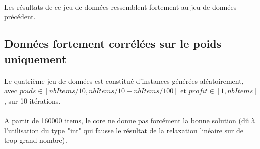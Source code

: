 \documentclass[12pt]{article}
\begin{document}
\paragraph{}Les résultats de ce jeu de données ressemblent fortement au jeu de données précédent.


\subsection{Données fortement corrélées sur le poids uniquement}

\paragraph{}Le quatrième jeu de données est constitué d'instances générées aléatoirement, avec $poids \in [nbItems/10, nbItems/10+nbItems/100]$ et $profit \in [1,nbItems]$, sur 10 itérations.

\begin{figure}[!h]
\begin{floatrow}
\end{floatrow}
\end{figure}

\paragraph{}A partir de 160000 items, le core ne donne pas forcément la bonne solution (dû à l'utilisation du type "int" qui fausse le résultat de la relaxation linéaire sur de trop grand nombre).
\end{document}
